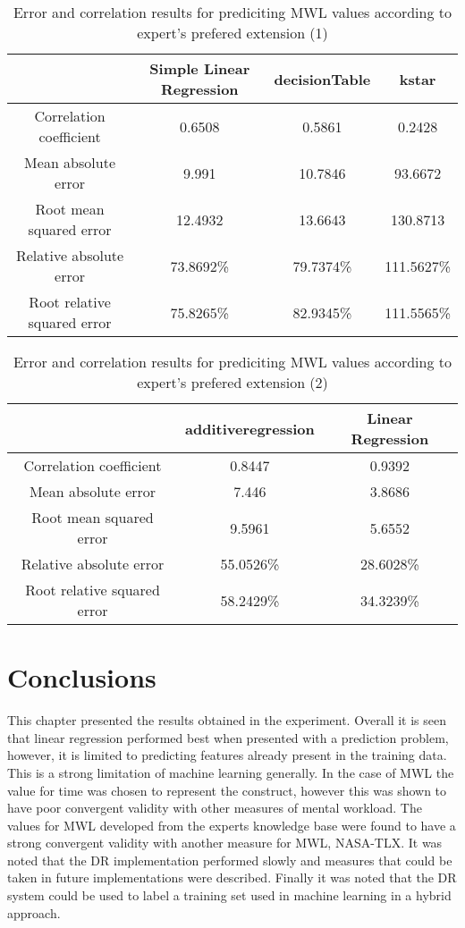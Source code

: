 \begin{table}[!htbp]
\centering
\begin{tabular}{|c|c|c|c|}
\hline
                            & Simple Linear Regression   & decisionTable  & kstar\\ \hline
Correlation coefficient     & 0.6508        & 0.5861         & 0.2428       \\
Mean absolute error         & 9.991        & 10.7846        & 93.6672       \\
Root mean squared error     & 12.4932      & 13.6643       & 130.8713       \\
Relative absolute error     & 73.8692\%    & 79.7374\%        & 111.5627\%  \\
Root relative squared error & 75.8265\%     & 82.9345\%      & 111.5565\%   \\
\hline
\end{tabular}
\caption{Error and correlation results for prediciting MWL values according to expert's prefered extension (1)}
\label{tab:mlhybrid1}
\end{table}


\begin{table}[!htbp]
\centering
\begin{tabular}{|c|c|c|}
\hline
                            & additiveregression & Linear Regression\\ \hline
Correlation coefficient     & 0.8447    & 0.9392 \\
Mean absolute error         & 7.446      & 3.8686 \\
Root mean squared error     & 9.5961    & 5.6552  \\
Relative absolute error     & 55.0526\% & 28.6028\%\\
Root relative squared error & 58.2429\%  & 34.3239\%\\
\hline
\end{tabular}
\caption{Error and correlation results for prediciting MWL values according to expert's prefered extension (2)}
\label{tab:mlhybrid2}
\end{table}

\section{Conclusions}

This chapter presented the results obtained in the experiment. Overall it is seen that linear regression performed best when presented with a prediction problem, however, it is limited to predicting features already present in the training data. This is a strong limitation of machine learning generally. In the case of MWL the value for time was chosen to represent the construct, however this was shown to have poor convergent validity with other measures of mental workload. The values for MWL developed from the experts knowledge base were found to have a strong convergent validity with another measure for MWL, NASA-TLX. It was noted that the DR implementation performed slowly and measures that could be taken in future implementations were described. Finally it was noted that the DR system could be used to label a training set used in machine learning in a hybrid approach. 